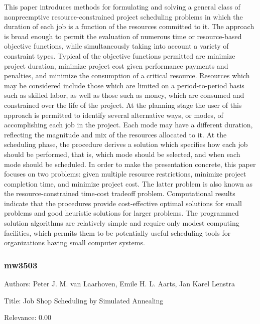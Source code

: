   This paper introduces methods for formulating and solving a general class of nonpreemptive resource-constrained project scheduling problems in which the duration of each job is a function of the resources committed to it. The approach is broad enough to permit the evaluation of numerous time or resource-based objective functions, while simultaneously taking into account a variety of constraint types. Typical of the objective functions permitted are minimize project duration, minimize project cost given performance payments and penalties, and minimize the consumption of a critical resource. Resources which may be considered include those which are limited on a period-to-period basis such as skilled labor, as well as those such as money, which are consumed and constrained over the life of the project. At the planning stage the user of this approach is permitted to identify several alternative ways, or modes, of accomplishing each job in the project. Each mode may have a different duration, reflecting the magnitude and mix of the resources allocated to it. At the scheduling phase, the procedure derives a solution which specifies how each job should be performed, that is, which mode should be selected, and when each mode should be scheduled. In order to make the presentation concrete, this paper focuses on two problems: given multiple resource restrictions, minimize project completion time, and minimize project cost. The latter problem is also known as the resource-constrained time-cost tradeoff problem.    Computational results indicate that the procedures provide cost-effective optimal solutions for small problems and good heuristic solutions for larger problems. The programmed solution algorithms are relatively simple and require only modest computing facilities, which permits them to be potentially useful scheduling tools for organizations having small computer systems.  

\subsubsection{mw3503}
\label{mw:mw3503}

Authors: Peter J. M. van Laarhoven, Emile H. L. Aarts, Jan Karel Lenstra

Title: Job Shop Scheduling by Simulated Annealing

Relevance:  0.00

